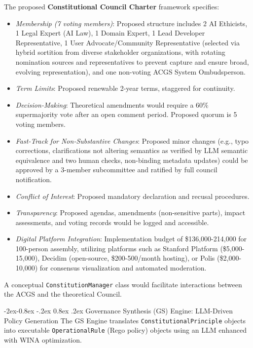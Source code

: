 \documentclass[manuscript,screen,9pt]{acmart}
\makeatletter
\renewcommand\subsubsection{\@startsection{subsubsection}{3}{\z@}%
  {-2ex\@plus -0.8ex \@minus -.2ex}%
  {0.8ex \@plus .2ex}%
  {\normalfont\normalsize\bfseries}}
\makeatother
\begin{document}
The proposed \textbf{Constitutional Council Charter} framework specifies:
\begin{itemize}[leftmargin=*,itemsep=1pt,parsep=1pt]
	\item \textit{Membership (7 voting members)}: Proposed structure includes 2 AI Ethicists, 1 Legal Expert (AI Law), 1 Domain Expert, 1 Lead Developer Representative, 1 User Advocate/Community Representative (selected via hybrid sortition from diverse stakeholder organizations, with rotating nomination sources and representatives to prevent capture and ensure broad, evolving representation), and one non-voting ACGS System Ombudsperson.
	\item \textit{Term Limits}: Proposed renewable 2-year terms, staggered for continuity.
	\item \textit{Decision-Making}: Theoretical amendments would require a 60\% supermajority vote after an open comment period. Proposed quorum is 5 voting members.
	\item \textit{Fast-Track for Non-Substantive Changes}: Proposed minor changes (e.g., typo corrections, clarifications not altering semantics as verified by LLM semantic equivalence and two human checks, non-binding metadata updates) could be approved by a 3-member subcommittee and ratified by full council notification.
	\item \textit{Conflict of Interest}: Proposed mandatory declaration and recusal procedures.
	\item \textit{Transparency}: Proposed agendas, amendments (non-sensitive parts), impact assessments, and voting records would be logged and accessible.
	\item \textit{Digital Platform Integration}: Implementation budget of \$136,000-214,000 for 100-person assembly, utilizing platforms such as Stanford Platform (\$5,000-15,000), Decidim (open-source, \$200-500/month hosting), or Polis (\$2,000-10,000) for consensus visualization and automated moderation.
\end{itemize}
A conceptual \texttt{ConstitutionManager} class would facilitate interactions between the ACGS and the theoretical Council.

\subsubsection{Governance Synthesis (GS) Engine: LLM-Driven Policy Generation}
\label{subsubsec:gs_engine_layer}
The GS Engine translates \texttt{ConstitutionalPrinciple} objects into executable \texttt{OperationalRule} (Rego policy) objects using an LLM enhanced with WINA optimization.
\end{document}
